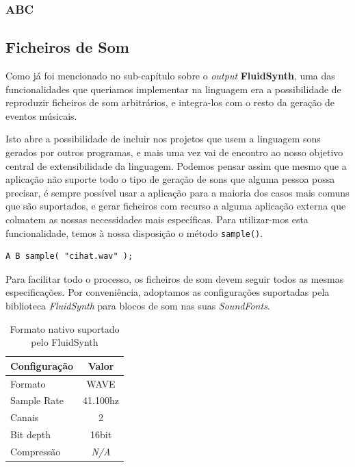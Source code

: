 \subsubsection{ABC}

\subsection{Ficheiros de Som}
Como já foi mencionado no sub-capítulo sobre o \textit{output} \textbf{FluidSynth}, uma das funcionalidades que queriamos implementar na linguagem era a possibilidade de reproduzir ficheiros de som arbitrários, e integra-los com o resto da geração de eventos músicais.

Isto abre a possibilidade de incluir nos projetos que usem a linguagem sons gerados por outros programas, e mais uma vez vai de encontro ao nosso objetivo central de extensibilidade da linguagem. Podemos pensar assim que mesmo que a aplicação não suporte todo o tipo de geração de sons que alguma pessoa possa precisar, é sempre possível usar a aplicação para a maioria dos casos mais comuns que são suportados, e gerar ficheiros com recurso a alguma aplicação externa que colmatem as nossas necessidades mais específicas. Para utilizar-mos esta funcionalidade, temos à nossa disposição o método \texttt{sample()}.

\begin{lstlisting}[caption=Exemplo de reproduzir um ficheiro a seguir a duas notas]
A B sample( "cihat.wav" );
\end{lstlisting}

Para facilitar todo o processo, os ficheiros de som devem seguir todos as mesmas especificações. Por conveniência, adoptamos as configurações suportadas pela biblioteca \textit{FluidSynth} para blocos de som nas suas \textit{SoundFonts}.

\begin{table}[h]
\centering
\def\arraystretch{1.3}
\begin{tabular}{|l|c|}
\hline
\textbf{Configuração} & \textbf{Valor} \\ \hline
Formato               & WAVE           \\ \hline
Sample Rate           & 41.100hz       \\ \hline
Canais                & 2              \\ \hline
Bit depth             & 16bit          \\ \hline
Compressão            & \textit{N/A}   \\ \hline
\end{tabular}
\caption{Formato nativo suportado pelo FluidSynth}
\label{tab:sounds-format}
\end{table}

